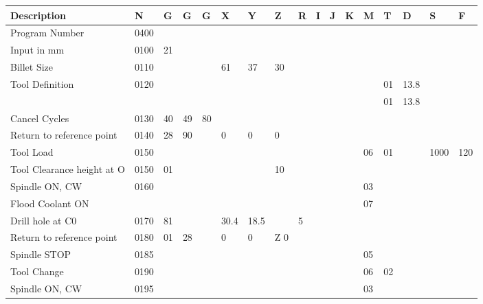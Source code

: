 \centering
\begin{landscape}
\begin{longtable}{|l|l|l|l|l|l|l|l|l|l|l|l|l|l|l|l|l|}
\hline
\textbf{Description} & \textbf{N} & \textbf{G} & \textbf{G} & \textbf{G} & \textbf{X} & \textbf{Y} & \textbf{Z} & \textbf{R} & \textbf{I} & \textbf{J} & \textbf{K} & \textbf{M} & \textbf{T} & \textbf{D} & \textbf{S} & \textbf{F}\\
\hline
Program Number & 0400 &  &  &  &  &  &  &  &  &  &  &  &  &  &  & \\
\hline
Input in mm & 0100 & 21 &  &  &  &  &  &  &  &  &  &  &  &  &  & \\
\hline
Billet Size & 0110 &  &  &  & 61 & 37 & 30 &  &  &  &  &  &  &  &  & \\
\hline
Tool Definition & 0120 &  &  &  &  &  &  &  &  &  &  &  & 01 & 13.8 &  & \\
\hline
 &  &  &  &  &  &  &  &  &  &  &  &  & 01 & 13.8 &  & \\
 \hline
Cancel Cycles & 0130 & 40 & 49 & 80 &  &  &  &  &  &  &  &  &  &  &  & \\
\hline
Return to reference point & 0140 & 28 & 90 &  & 0 & 0 & 0 &  &  &  &  &  &  &  &  & \\
\hline
Tool Load & 0150 &  & & & &  & & & & & & 06 & 01 & & 1000 & 120\\
\hline
Tool Clearance height at O & 0150 & 01 & & & & & 10 & & & & & & & & &\\
\hline
Spindle ON, CW & 0160 & & & & & & & & & & & 03 & & & &\\
\hline
Flood Coolant ON & & & & & & & & & & & & 07 & & & &\\
\hline
Drill hole at C0 & 0170 & 81 & & & 30.4 & 18.5 & & 5 & & & & & & &  &\\
\hline
Return to reference point & 0180 & 01 & 28 & & 0 & 0 & Z 0 & & & & & & & & &\\
\hline
Spindle STOP & 0185 & & & & & & & & & & & 05 & & & & \\
\hline
Tool Change & 0190 &  & & & & & & & & & & 06 & 02 & & & \\
\hline
Spindle ON, CW & 0195 & & & & & & & & & & & 03 & & & &\\
\hline
\hline
\end{longtable}
\end{landscape}


